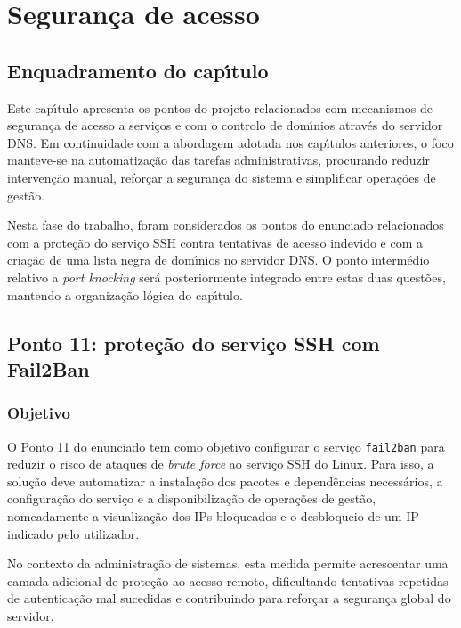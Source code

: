 \setcounter{chapter}{6}
\chapter{Seguran\c{c}a de acesso}
\label{cap7}

\section{Enquadramento do cap\'{\i}tulo}

Este cap\'{\i}tulo apresenta os pontos do projeto relacionados com mecanismos de seguran\c{c}a de acesso a servi\c{c}os e com o controlo de dom\'{\i}nios atrav\'es do servidor DNS. Em continuidade com a abordagem adotada nos cap\'{\i}tulos anteriores, o foco manteve-se na automatiza\c{c}\~ao das tarefas administrativas, procurando reduzir interven\c{c}\~ao manual, refor\c{c}ar a seguran\c{c}a do sistema e simplificar opera\c{c}\~oes de gest\~ao.

Nesta fase do trabalho, foram considerados os pontos do enunciado relacionados com a prote\c{c}\~ao do servi\c{c}o SSH contra tentativas de acesso indevido e com a cria\c{c}\~ao de uma lista negra de dom\'{\i}nios no servidor DNS. O ponto interm\'edio relativo a \textit{port knocking} ser\'a posteriormente integrado entre estas duas quest\~oes, mantendo a organiza\c{c}\~ao l\'ogica do cap\'{\i}tulo.

\section{Ponto 11: prote\c{c}\~ao do servi\c{c}o SSH com Fail2Ban}
\label{sec:p11}

\subsection{Objetivo}

O Ponto 11 do enunciado tem como objetivo configurar o servi\c{c}o \texttt{fail2ban} para reduzir o risco de ataques de \textit{brute force} ao servi\c{c}o SSH do Linux. Para isso, a solu\c{c}\~ao deve automatizar a instala\c{c}\~ao dos pacotes e depend\^encias necess\'arios, a configura\c{c}\~ao do servi\c{c}o e a disponibiliza\c{c}\~ao de opera\c{c}\~oes de gest\~ao, nomeadamente a visualiza\c{c}\~ao dos IPs bloqueados e o desbloqueio de um IP indicado pelo utilizador.

No contexto da administra\c{c}\~ao de sistemas, esta medida permite acrescentar uma camada adicional de prote\c{c}\~ao ao acesso remoto, dificultando tentativas repetidas de autentica\c{c}\~ao mal sucedidas e contribuindo para refor\c{c}ar a seguran\c{c}a global do servidor.

